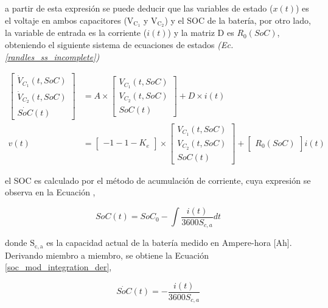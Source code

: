 \documentclass[10pt,a4paper]{article}
\begin{document}
a partir de esta expresi\'on se puede deducir que las variables de estado 
($x(t)$) es el voltaje en ambos capacitores ($\mathrm{V_{C_1}}$ y 
$\mathrm{V_{C_2}}$) y el \acrshort{SOC} de la bater\'ia, por otro lado, la 
variable de entrada es la corriente ($i(t)$) y la matriz D es $R_0(SoC)$, 
obteniendo el siguiente sistema de ecuaciones de estados 
\emph{(Ec. \ref{randles_ss_incomplete})}

\begin{align}
    \begin{bmatrix}
        \dot{V}_{C_1}(t, SoC) \\ \dot{V}_{C_2}(t, SoC) \\ \dot{SoC}(t)
    \end{bmatrix} &= 
    A\times\begin{bmatrix}V_{C_1}(t, SoC) \\ V_{C_2}(t, SoC) \\ SoC(t)\end{bmatrix}
    +
    D\times i(t)\nonumber \\
    v(t) &= \begin{bmatrix} -1 -1 -K_e \end{bmatrix} \times 
    \begin{bmatrix} V_{C_1}(t, SoC) \\ V_{C_2}(t, SoC) \\ SoC(t) \end{bmatrix} +
    \begin{bmatrix} R_0(SoC) \end{bmatrix} i(t)\label{randles_ss_incomplete}
\end{align}

el \acrshort{SOC} es calculado por el m\'etodo de acumulaci\'on de
corriente, cuya expresi\'on se observa en la Ecuaci\'on
\label{soc_mod_integration},

\begin{equation}
    SoC(t) = SoC_{0}  - \int \frac{i\left(t\right)}{3600 S_{c,a}} dt
    \label{soc_mod_integration}
\end{equation}

donde $\mathrm{S_{c,a}}$ es la capacidad actual de la bater\'ia medido en
Ampere-hora [Ah]. Derivando miembro a miembro, se obtiene la Ecuaci\'on
\ref{soc_mod_integration_der},

\begin{equation}
    \dot{SoC}(t) = - \frac{i(t)}{3600S_{c,a}}\label{soc_mod_integration_der}
\end{equation}
\end{document}
